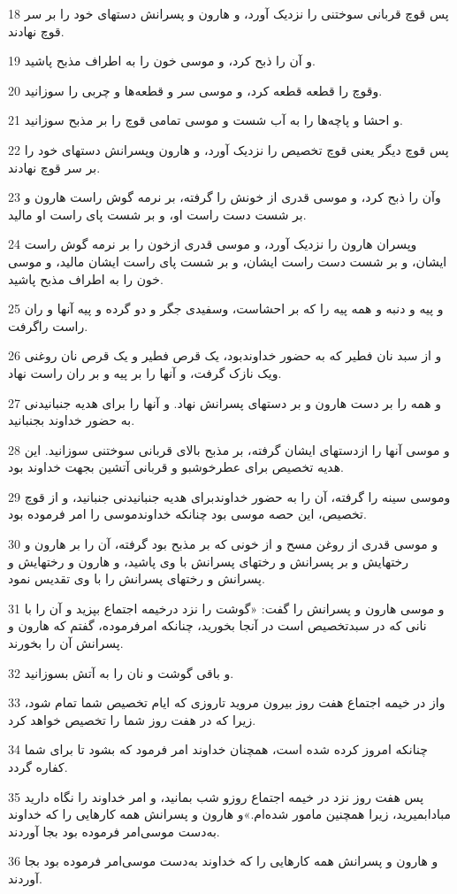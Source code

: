 \par 18 پس قوچ قربانی سوختنی را نزدیک آورد، و هارون و پسرانش دستهای خود را بر سر قوچ نهادند.
\par 19 و آن را ذبح کرد، و موسی خون را به اطراف مذبح پاشید.
\par 20 وقوچ را قطعه قطعه کرد، و موسی سر و قطعه‌ها و چربی را سوزانید.
\par 21 و احشا و پاچه‌ها را به آب شست و موسی تمامی قوچ را بر مذبح سوزانید.
\par 22 پس قوچ دیگر یعنی قوچ تخصیص را نزدیک آورد، و هارون وپسرانش دستهای خود را بر سر قوچ نهادند.
\par 23 وآن را ذبح کرد، و موسی قدری از خونش را گرفته، بر نرمه گوش راست هارون و بر شست دست راست او، و بر شست پای راست او مالید.
\par 24 وپسران هارون را نزدیک آورد، و موسی قدری ازخون را بر نرمه گوش راست ایشان، و بر شست دست راست ایشان، و بر شست پای راست ایشان مالید، و موسی خون را به اطراف مذبح پاشید.
\par 25 و پیه و دنبه و همه پیه را که بر احشاست، وسفیدی جگر و دو گرده و پیه آنها و ران راست راگرفت.
\par 26 و از سبد نان فطیر که به حضور خداوندبود، یک قرص فطیر و یک قرص نان روغنی ویک نازک گرفت، و آنها را بر پیه و بر ران راست نهاد.
\par 27 و همه را بر دست هارون و بر دستهای پسرانش نهاد. و آنها را برای هدیه جنبانیدنی به حضور خداوند بجنبانید.
\par 28 و موسی آنها را ازدستهای ایشان گرفته، بر مذبح بالای قربانی سوختنی سوزانید. این هدیه تخصیص برای عطرخوشبو و قربانی آتشین بجهت خداوند بود.
\par 29 وموسی سینه را گرفته، آن را به حضور خداوندبرای هدیه جنبانیدنی جنبانید، و از قوچ تخصیص، این حصه موسی بود چنانکه خداوندموسی را امر فرموده بود.
\par 30 و موسی قدری از روغن مسح و از خونی که بر مذبح بود گرفته، آن را بر هارون و رختهایش و بر پسرانش و رختهای پسرانش با وی پاشید، و هارون و رختهایش و پسرانش و رختهای پسرانش را با وی تقدیس نمود.
\par 31 و موسی هارون و پسرانش را گفت: «گوشت را نزد درخیمه اجتماع بپزید و آن را با نانی که در سبدتخصیص است در آنجا بخورید، چنانکه امرفرموده، گفتم که هارون و پسرانش آن را بخورند.
\par 32 و باقی گوشت و نان را به آتش بسوزانید.
\par 33 واز در خیمه اجتماع هفت روز بیرون مروید تاروزی که ایام تخصیص شما تمام شود، زیرا که در هفت روز شما را تخصیص خواهد کرد.
\par 34 چنانکه امروز کرده شده است، همچنان خداوند امر فرمود که بشود تا برای شما کفاره گردد.
\par 35 پس هفت روز نزد در خیمه اجتماع روزو شب بمانید، و امر خداوند را نگاه دارید مبادابمیرید، زیرا همچنین مامور شده‌ام.»و هارون و پسرانش همه کارهایی را که خداوند به‌دست موسی‌امر فرموده بود بجا آوردند.
\par 36 و هارون و پسرانش همه کارهایی را که خداوند به‌دست موسی‌امر فرموده بود بجا آوردند.
 
